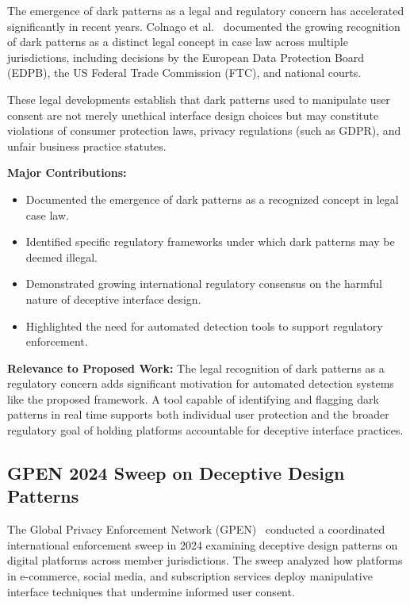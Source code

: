 The emergence of dark patterns as a legal and regulatory concern has accelerated significantly in recent years. Colnago et al.~\cite{legal2023} documented the growing recognition of dark patterns as a distinct legal concept in case law across multiple jurisdictions, including decisions by the European Data Protection Board (EDPB), the US Federal Trade Commission (FTC), and national courts.

These legal developments establish that dark patterns used to manipulate user consent are not merely unethical interface design choices but may constitute violations of consumer protection laws, privacy regulations (such as GDPR), and unfair business practice statutes.

\vspace{0.3cm}

\textbf{Major Contributions:}
\begin{itemize}
\item Documented the emergence of dark patterns as a recognized concept in legal case law.
\item Identified specific regulatory frameworks under which dark patterns may be deemed illegal.
\item Demonstrated growing international regulatory consensus on the harmful nature of deceptive interface design.
\item Highlighted the need for automated detection tools to support regulatory enforcement.
\end{itemize}

\vspace{0.3cm}

\textbf{Relevance to Proposed Work:}
The legal recognition of dark patterns as a regulatory concern adds significant motivation for automated detection systems like the proposed framework. A tool capable of identifying and flagging dark patterns in real time supports both individual user protection and the broader regulatory goal of holding platforms accountable for deceptive interface practices.


\subsection{GPEN 2024 Sweep on Deceptive Design Patterns}

The Global Privacy Enforcement Network (GPEN)~\cite{gpen2024} conducted a coordinated international enforcement sweep in 2024 examining deceptive design patterns on digital platforms across member jurisdictions. The sweep analyzed how platforms in e-commerce, social media, and subscription services deploy manipulative interface techniques that undermine informed user consent.

